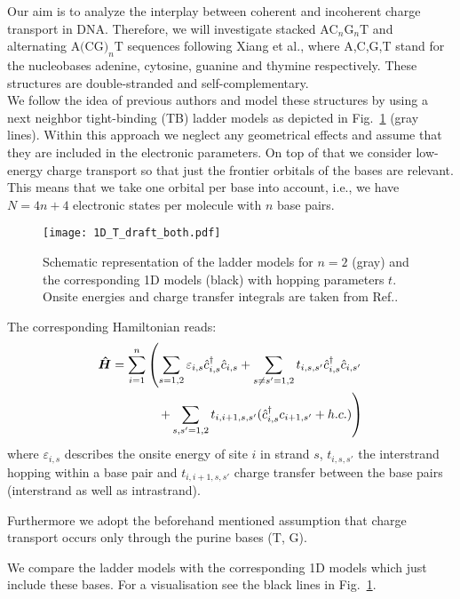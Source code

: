 \documentclass[reprint,superscriptaddress,nofootinbib,amsmath,amssymb,prb,floatfix]{revtex4-1}
\begin{document}
Our aim is to analyze the interplay between coherent and incoherent charge transport in DNA.
Therefore, we will investigate stacked $\text{AC}_n\text{G}_n\text{T}$ and alternating $\text{A(CG)}_n\text{T}$ sequences following Xiang et al.\cite{xiang_intermediate_2015}, where A,C,G,T stand for the nucleobases adenine, cytosine, guanine and thymine respectively. These structures are double-stranded and self-complementary.\\
We follow the idea of previous authors\cite{yi_conduction_2003, gutierrez_inelastic_2006,
  wang_charge_2006, zilly_conductance_2010, kim_intermediate_2016,Korol1712.08515} and model these
structures by using a next neighbor tight-binding (TB) ladder models as depicted in
Fig.~\ref{Models} (gray lines). Within this approach we neglect any geometrical effects and assume
that they are included in the electronic parameters. On top of that we consider low-energy charge
transport so that just the frontier orbitals of the bases are relevant. This means that we take one
orbital per base into account, i.e., we have $N=4n+4$ electronic states per molecule with $n$ base
pairs.

\begin{figure*}
 \texttt{[image: 1D\_T\_draft\_both.pdf]}
 \caption{Schematic representation of the ladder models for $n=2$ (gray) and the corresponding 1D models (black) with hopping parameters $t$. Onsite energies and charge transfer integrals are taken from Ref..}
 \label{Models}
\end{figure*}

The corresponding Hamiltonian reads:
\begin{align}
\boldsymbol{\hat{H}} = \sum_{i=1}^{n}  \left(\sum_{s=1,2} \varepsilon_{i,s} \hat{c}_{i,s}^\dagger \hat{c}_{i,s} + \sum_{s\neq s'=1,2} t_{i,s,s'} \hat{c}_{i,s}^\dagger \hat{c}_{i,s'} \right. \notag\\ 
 \left. + \sum_{s,s' = 1,2} t_{i,i+1,s,s'} (\hat{c}_{i,s}^\dagger c_{i+1,s'} + h.c.)  \right)
\end{align}
where $\varepsilon_{i,s}$ describes the onsite energy of site $i$ in strand $s$, $t_{i,s,s'}$ the
interstrand hopping within a base pair and $t_{i,i+1,s,s'}$ charge transfer between the base pairs
(interstrand as well as intrastrand).

Furthermore we adopt the beforehand mentioned assumption that charge transport occurs only through
the purine bases (T, G).

We compare the ladder models with the corresponding 1D models which just include these bases. For a
visualisation see the black lines in Fig.~\ref{Models}.
\end{document}
